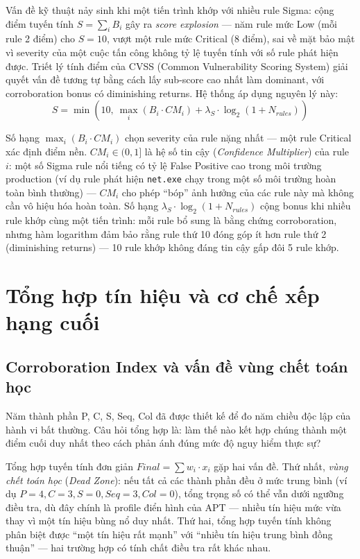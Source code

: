 \documentclass[../main.tex]{subfiles}
\begin{document}
Vấn đề kỹ thuật nảy sinh khi một tiến trình khớp với nhiều rule Sigma: cộng điểm tuyến tính $S = \sum_i B_i$ gây ra \textit{score explosion} — năm rule mức Low (mỗi rule 2 điểm) cho $S = 10$, vượt một rule mức Critical (8 điểm), sai về mặt bảo mật vì severity của một cuộc tấn công không tỷ lệ tuyến tính với số rule phát hiện được. Triết lý tính điểm của CVSS (Common Vulnerability Scoring System) giải quyết vấn đề tương tự bằng cách lấy sub-score cao nhất làm dominant, với corroboration bonus có diminishing returns. Hệ thống áp dụng nguyên lý này:
\begin{equation}
    S = \min\!\left(10,\ \max_i\!\left(B_i \cdot CM_i\right) + \lambda_S \cdot \log_2(1 + N_{rules})\right) \tag{1.23}
\end{equation}

Số hạng $\max_i(B_i \cdot CM_i)$ chọn severity của rule nặng nhất — một rule Critical xác định điểm nền. $CM_i \in (0, 1]$ là hệ số tin cậy (\textit{Confidence Multiplier}) của rule $i$: một số Sigma rule nổi tiếng có tỷ lệ False Positive cao trong môi trường production (ví dụ rule phát hiện \texttt{net.exe} chạy trong một số môi trường hoàn toàn bình thường) — $CM_i$ cho phép ``bóp'' ảnh hưởng của các rule này mà không cần vô hiệu hóa hoàn toàn. Số hạng $\lambda_S \cdot \log_2(1 + N_{rules})$ cộng bonus khi nhiều rule khớp cùng một tiến trình: mỗi rule bổ sung là bằng chứng corroboration, nhưng hàm logarithm đảm bảo rằng rule thứ 10 đóng góp ít hơn rule thứ 2 (diminishing returns) — 10 rule khớp không đáng tin cậy gấp đôi 5 rule khớp.

\section{Tổng hợp tín hiệu và cơ chế xếp hạng cuối}
\label{section:2.5}

\subsection{Corroboration Index và vấn đề vùng chết toán học}
\label{subsection:2.5.1}

Năm thành phần P, C, S, Seq, Col đã được thiết kế để đo năm chiều độc lập của hành vi bất thường. Câu hỏi tổng hợp là: làm thế nào kết hợp chúng thành một điểm cuối duy nhất theo cách phản ánh đúng mức độ nguy hiểm thực sự?

Tổng hợp tuyến tính đơn giản $Final = \sum w_i \cdot x_i$ gặp hai vấn đề. Thứ nhất, \textit{vùng chết toán học} (\textit{Dead Zone}): nếu tất cả các thành phần đều ở mức trung bình (ví dụ $P=4, C=3, S=0, Seq=3, Col=0$), tổng trọng số có thể vẫn dưới ngưỡng điều tra, dù đây chính là profile điển hình của APT — nhiều tín hiệu mức vừa thay vì một tín hiệu bùng nổ duy nhất. Thứ hai, tổng hợp tuyến tính không phân biệt được ``một tín hiệu rất mạnh'' với ``nhiều tín hiệu trung bình đồng thuận'' — hai trường hợp có tính chất điều tra rất khác nhau.
\end{document}

